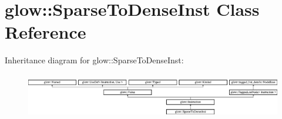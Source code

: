 \hypertarget{classglow_1_1_sparse_to_dense_inst}{}\section{glow\+:\+:Sparse\+To\+Dense\+Inst Class Reference}
\label{classglow_1_1_sparse_to_dense_inst}
Inheritance diagram for glow\+:\+:Sparse\+To\+Dense\+Inst\+:\begin{figure}[H]
\begin{center}
\leavevmode
\includegraphics[height=1.991111cm]{classglow_1_1_sparse_to_dense_inst}
\end{center}
\end{figure}
